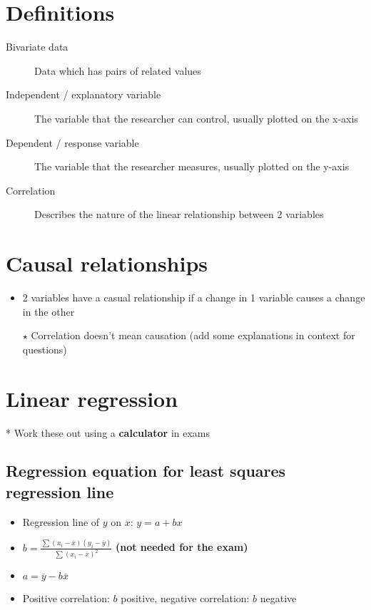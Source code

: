 \section{Definitions}
\begin{description}
    \item[Bivariate data] Data which has pairs of related values
    \item[Independent / explanatory variable] The variable that the researcher can control, usually plotted on the x-axis
    \item[Dependent / response variable] The variable that the researcher measures, usually plotted on the y-axis
    \item[Correlation] Describes the nature of the linear relationship between 2 variables
\end{description}

\section{Causal relationships}
\begin{itemize}
    \item 2 variables have a casual relationship if a change in 1 variable causes a change in the other
    \item[$\star$] Correlation doesn't mean causation (add some explanations in context for questions)
\end{itemize}

\section{Linear regression}
* Work these out using a \textbf{calculator} in exams
\subsection{Regression equation for least squares regression line}
\begin{itemize}
    \item Regression line of $y$ on $x$: $y=a+bx$
    \item $b=\frac{\sum (x_i-\overline{x}) (y_i-\overline{y})}{\sum (x_i-\overline{x})^2}$ \textbf{(not needed for the exam)}
    \item $a=\overline{y}-b\overline{x}$
    \item Positive correlation: $b$ positive, negative correlation: $b$ negative
\end{itemize}

